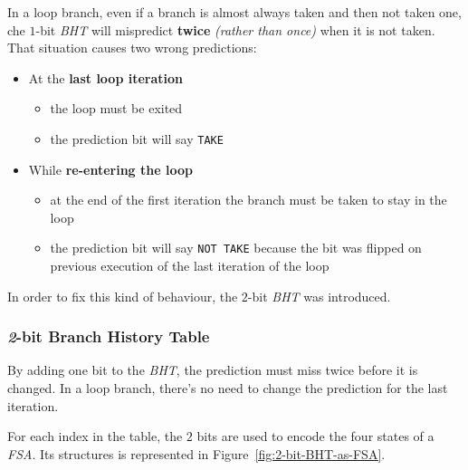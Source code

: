\documentclass[english]{article}
\begin{document}
\bigskip
In a loop branch, even if a branch is almost always taken and then not taken one, che \(1\)-bit \textit{BHT} will mispredict \textbf{twice} \textit{(rather than once)} when it is not taken.
That situation causes two wrong predictions:
\begin{itemize}
  \item At the \textbf{last loop iteration}
        \begin{itemize}
          \item the loop must be exited
          \item the prediction bit will say \texttt{TAKE}
        \end{itemize}
  \item While \textbf{re-entering the loop}
        \begin{itemize}
          \item at the end of the first iteration the branch must be taken to stay in the loop
          \item the prediction bit will say \texttt{NOT TAKE} because the bit was flipped on previous execution of the last iteration of the loop
        \end{itemize}
\end{itemize}

In order to fix this kind of behaviour, the \(2\)-bit \textit{BHT} was introduced.

\subsubsection{\textit{2}-bit Branch History Table}

By adding one bit to the \textit{BHT}, the prediction must miss twice before it is changed.
In a loop branch, there's no need to change the prediction for the last iteration.

For each index in the table, the \(2\) bits are used to encode the four states of a \textit{FSA}.
Its structures is represented in Figure~\ref{fig:2-bit-BHT-as-FSA}.
\end{document}
